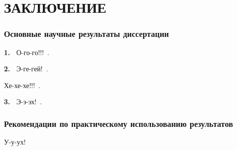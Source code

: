 \chapter*{ЗАКЛЮЧЕНИЕ}

\vspace{-10pt}
\subsection*{Основные научные результаты диссертации}

\vspace{-16pt}
\textbf{1.~}
О-го-го!!!~\cite{myarticle1, myarticle2}.


\textbf{2.~}
Э-ге-гей!~\cite{myarticle3, myarticle4, myarticle5}.

Хе-хе-хе!!!~\cite{myarticle4, myarticle5}.


\textbf{3.~}
Э-э-эх!~\cite{myarticle6}.




\vspace{-10pt}
\subsection*{Рекомендации по практическому использованию результатов}

\vspace{-16pt}

У-у-ух!